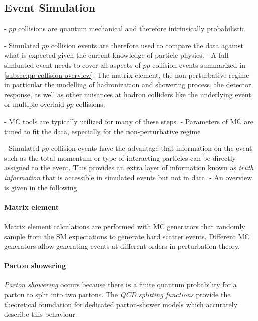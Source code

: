 \subsection{Event Simulation}
- $pp$ collisions are quantum mechanical and therefore intrinsically probabilistic

- Simulated $pp$ collision events are therefore used to compare the data against what is expected given the current knowledge of particle physics.
- A full simluated event needs to cover all aspects of $pp$ collision events summarized in \cref{subsec:pp-collision-overview}: The matrix element, the non-perturbative regime in particular the modelling of hadronization and showering process, the detector response, as well as other nuisances at hadron colliders like the underlying event or multiple overlaid $pp$ collisions.

- MC tools are typically utilized for many of these steps.
- Parameters of MC are tuned to fit the data, especially for the non-perturbative regime

- Simulated $pp$ collision events have the advantage that information on the event such as the total momentum or type of interacting particles can be directly assigned to the event. This provides an extra layer of information known as \emph{truth information} that is accessible in simulated events but not in data.
- An overview is given in the following

\paragraph{Matrix element}
Matrix element calculations are performed with MC generators that randomly sample from the SM expectations to generate hard scatter events. Different MC generators allow generating events at different orders in perturbation theory. 
\paragraph{Parton showering}
\emph{Parton showering} occurs because there is a finite quantum probability for a parton to split into two partons. The \emph{QCD splitting functions} \cite{Altarelli:1977zs} provide the theoretical foundation for dedicated parton-shower models which accurately describe this behaviour.
